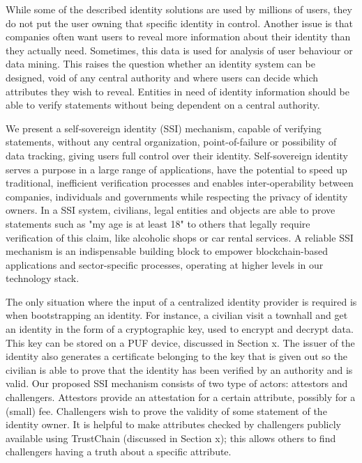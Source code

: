 \documentclass[USenglish]{article}
\begin{document}
While some of the described identity solutions are used by millions of users, they do not put the user owning that specific identity in control.
Another issue is that companies often want users to reveal more information about their identity than they actually need.
Sometimes, this data is used for analysis of user behaviour or data mining.
This raises the question whether an identity system can be designed, void of any central authority and where users can decide which attributes they wish to reveal.
Entities in need of identity information should be able to verify statements without being dependent on a central authority.

We present a self-sovereign identity (SSI) mechanism, capable of verifying statements, without any central organization, point-of-failure or possibility of data tracking, giving users full control over their identity.
Self-sovereign identity serves a purpose in a large range of applications, have the potential to speed up traditional, inefficient verification processes and enables inter-operability between companies, individuals and governments while respecting the privacy of identity owners.
In a SSI system, civilians, legal entities and objects are able to prove statements such as "my age is at least 18" to others that legally require verification of this claim, like alcoholic shops or car rental services.
A reliable SSI mechanism is an indispensable building block to empower blockchain-based applications and sector-specific processes, operating at higher levels in our technology stack.

The only situation where the input of a centralized identity provider is required is when bootstrapping an identity.
For instance, a civilian visit a townhall and get an identity in the form of a cryptographic key, used to encrypt and decrypt data.
This key can be stored on a PUF device, discussed in Section x.
The issuer of the identity also generates a certificate belonging to the key that is given out so the civilian is able to prove that the identity has been verified by an authority and is valid.
Our proposed SSI mechanism consists of two type of actors: attestors and challengers.
Attestors provide an attestation for a certain attribute, possibly for a (small) fee.
Challengers wish to prove the validity of some statement of the identity owner.
It is helpful to make attributes checked by challengers publicly available using TrustChain (discussed in Section x); this allows others to find challengers having a truth about a specific attribute.
\end{document}
